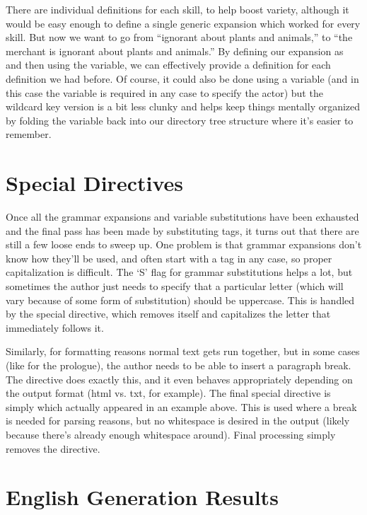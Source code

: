 There are individual  definitions for each skill, to help boost variety, although it would be easy enough to define a single generic expansion which worked for every skill.
%
But now we want to go from ``ignorant about plants and animals,'' to ``the merchant is ignorant about plants and animals.''
%
By defining our expansion as  and then using the \exchar{\_} variable, we can effectively provide a  definition for each  definition we had before.
%
Of course, it could also be done using a variable (and in this case the variable  is required in any case to specify the actor) but the wildcard key version is a bit less clunky and helps keep things mentally organized by folding the variable back into our directory tree structure where it's easier to remember.

\section{Special Directives}

Once all the grammar expansions and variable substitutions have been exhausted and the final pass has been made by substituting tags, it turns out that there are still a few loose ends to sweep up.
%
One problem is that grammar expansions don't know how they'll be used, and often start with a tag in any case, so proper capitalization is difficult.
%
The `S' flag for grammar substitutions helps a lot, but sometimes the author just needs to specify that a particular letter (which will vary because of some form of substitution) should be uppercase.
%
This is handled by the special  directive, which removes itself and capitalizes the letter that immediately follows it.


Similarly, for formatting reasons normal text gets run together, but in some cases (like for the prologue), the author needs to be able to insert a paragraph break.
%
The  directive does exactly this, and it even behaves appropriately depending on the output format (html vs. txt, for example).
%
The final special directive is simply  which actually appeared in an example above.
%
This is used where a break is needed for parsing reasons, but no whitespace is desired in the output (likely because there's already enough whitespace around).
%
Final processing simply removes the  directive.


\section{English Generation Results}

